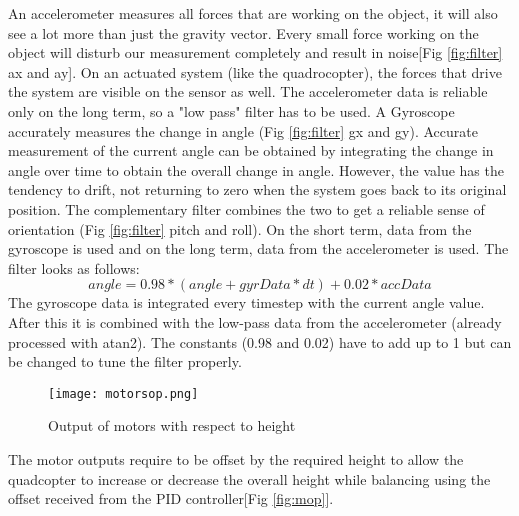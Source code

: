 An accelerometer measures all forces that are working on the object, it will also see a lot more than just the gravity vector. Every small force working on the object will disturb our measurement completely and result in noise[Fig \ref{fig:filter} ax and ay]. On an actuated system (like the quadrocopter), the forces that drive the system are visible on the sensor as well. The accelerometer data is reliable only on the long term, so a "low pass" filter has to be used.
\newline \newline
A Gyroscope accurately measures the change in angle (Fig \ref{fig:filter} gx and gy). Accurate measurement of the current angle can be obtained by integrating the change in angle over time to obtain the overall change in angle. However, the value has the tendency to drift, not returning to zero when the system goes back to its original position. 
\newline \newline
The complementary filter combines the two to get a reliable sense of orientation (Fig \ref{fig:filter} pitch and roll). On the short term, data from the gyroscope is used and on the long term, data from the accelerometer is used. The filter looks as follows:
\begin{equation}
angle = 0.98*(angle+gyrData*dt)+0.02*accData
\end{equation}
\newline \newline
The gyroscope data is integrated every timestep with the current angle value. After this it is combined with the low-pass data from the accelerometer (already processed with atan2). The constants (0.98 and 0.02) have to add up to 1 but can be changed to tune the filter properly.

\begin{figure}[H]
  \centering
  \texttt{[image: motorsop.png]}
  \caption{Output of motors with respect to height\label{fig:mop}}
  \label{Motor output}  
\end{figure}
\noindent
The motor outputs require to be offset by the required height to allow the quadcopter to increase or decrease the overall height while balancing using the offset received from the PID controller[Fig \ref{fig:mop}].

